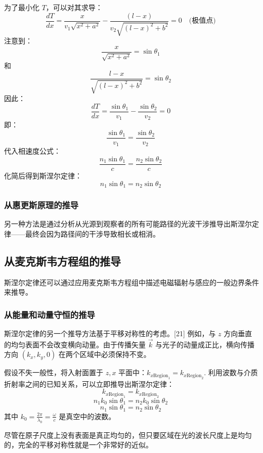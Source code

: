 为了最小化 \( T \)，可以对其求导：
\[
\frac{dT}{dx} = \frac{x}{v_1 \sqrt{x^2 + a^2}} - \frac{(l - x)}{v_2 \sqrt{(l - x)^2 + b^2}} = 0 \quad \text{(极值点)}~
\]
注意到：
\[
\frac{x}{\sqrt{x^2 + a^2}} = \sin \theta_1~
\]
和
\[
\frac{l - x}{\sqrt{(l - x)^2 + b^2}} = \sin \theta_2~
\]
因此：
\[
\frac{dT}{dx} = \frac{\sin \theta_1}{v_1} - \frac{\sin \theta_2}{v_2} = 0~
\]
即：
\[
\frac{\sin \theta_1}{v_1} = \frac{\sin \theta_2}{v_2}~
\]
代入相速度公式：
\[
\frac{n_1 \sin \theta_1}{c} = \frac{n_2 \sin \theta_2}{c}~
\]
化简后得到斯涅尔定律：
\[
n_1 \sin \theta_1 = n_2 \sin \theta_2~
\]
\subsubsection{从惠更斯原理的推导} 
另一种方法是通过分析从光源到观察者的所有可能路径的光波干涉推导出斯涅尔定律——最终会因为路径间的干涉导致相长或相消。  
\subsection{从麦克斯韦方程组的推导}  
斯涅尔定律还可以通过应用麦克斯韦方程组中描述电磁辐射与感应的一般边界条件来推导。
\subsubsection{从能量和动量守恒的推导}  
斯涅尔定律的另一个推导方法基于平移对称性的考虑。[21] 例如，与 \( z \) 方向垂直的均匀表面不会改变横向动量。由于传播矢量 \(\vec{k}\) 与光子的动量成正比，横向传播方向 \((k_x, k_y, 0)\) 在两个区域中必须保持不变。  

假设不失一般性，将入射面置于 \( z, x \) 平面中：\(k_{x\text{Region}_1} = k_{x\text{Region}_2}.\) 
利用波数与介质折射率之间的已知关系，可以立即推导出斯涅尔定律：  
\[
k_{x\text{Region}_1} = k_{x\text{Region}_2}~
\]
\[
n_1 k_0 \sin \theta_1 = n_2 k_0 \sin \theta_2~
\]
\[
n_1 \sin \theta_1 = n_2 \sin \theta_2~
\]
其中  
\( k_0 = \frac{2\pi}{\lambda_0} = \frac{\omega}{c} \) 是真空中的波数。  

尽管在原子尺度上没有表面是真正均匀的，但只要区域在光的波长尺度上是均匀的，完全的平移对称性就是一个非常好的近似。